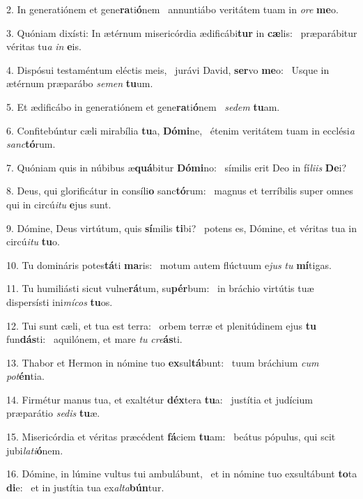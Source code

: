2. In generatiónem et gene\textbf{ra}ti\textbf{ó}nem \ast\  annuntiábo veritátem tuam in \textit{o}\textit{re} \textbf{me}o.\

3. Quóniam dixísti: In ætérnum misericórdia ædificábi\textbf{tur} in \textbf{cæ}lis: \ast\  præparábitur véritas tu\textit{a} \textit{in} \textbf{e}is.\

4. Dispósui testaméntum eléctis meis, \dag\  jurávi David, \textbf{ser}vo \textbf{me}o: \ast\  Usque in ætérnum præparábo \textit{se}\textit{men} \textbf{tu}um.\

5. Et ædificábo in generatiónem et gene\textbf{ra}ti\textbf{ó}nem \ast\  \textit{se}\textit{dem} \textbf{tu}am.\

6. Confitebúntur cæli mirabília \textbf{tu}a, \textbf{Dó}\textbf{mi}ne, \ast\  étenim veritátem tuam in ecclési\textit{a} \textit{sanc}\textbf{tó}rum.\

7. Quóniam quis in núbibus æ\textbf{quá}bitur \textbf{Dó}\textbf{mi}no: \ast\  símilis erit Deo in fí\textit{li}\textit{is} \textbf{De}i?\

8. Deus, qui glorificátur in consíli\textbf{o} sanc\textbf{tó}rum: \ast\  magnus et terríbilis super omnes qui in circú\textit{i}\textit{tu} \textbf{e}jus sunt.\

9. Dómine, Deus virtútum, quis \textbf{sí}milis \textbf{ti}bi? \ast\  potens es, Dómine, et véritas tua in circú\textit{i}\textit{tu} \textbf{tu}o.\

10. Tu domináris potes\textbf{tá}ti \textbf{ma}ris: \ast\  motum autem flúctuum e\textit{jus} \textit{tu} \textbf{mí}tigas.\

11. Tu humiliásti sicut vulne\textbf{rá}tum, su\textbf{pér}bum: \ast\  in bráchio virtútis tuæ dispersísti ini\textit{mí}\textit{cos} \textbf{tu}os.\

12. Tui sunt cæli, et tua est terra: \dag\  orbem terræ et plenitúdinem ejus \textbf{tu} fun\textbf{dás}ti: \ast\  aquilónem, et mare \textit{tu} \textit{cre}\textbf{ás}ti.\

13. Thabor et Hermon in nómine tuo \textbf{ex}sul\textbf{tá}bunt: \ast\  tuum bráchium \textit{cum} \textit{pot}\textbf{én}tia.\

14. Firmétur manus tua, et exaltétur \textbf{déx}tera \textbf{tu}a: \ast\  justítia et judícium præparátio \textit{se}\textit{dis} \textbf{tu}æ.\

15. Misericórdia et véritas præcédent \textbf{fá}ciem \textbf{tu}am: \ast\  beátus pópulus, qui scit jubi\textit{la}\textit{ti}\textbf{ó}nem.\

16. Dómine, in lúmine vultus tui ambulábunt, \dag\  et in nómine tuo exsultábunt \textbf{to}ta \textbf{di}e: \ast\  et in justítia tua ex\textit{al}\textit{ta}\textbf{bún}tur.\

